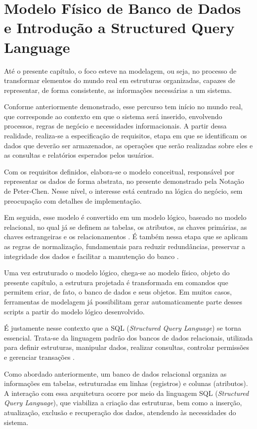 \chapter{Modelo Físico de Banco de Dados e Introdução a Structured Query Language}
\label{cap:modelo_fisico}

Até o presente capítulo, o foco esteve na modelagem, ou seja, no processo de transformar elementos do mundo real em estruturas organizadas, capazes de representar, de forma consistente, as informações necessárias a um sistema.

Conforme anteriormente demonstrado, esse percurso tem início no mundo real, que corresponde ao contexto em que o sistema será inserido, envolvendo processos, regras de negócio e necessidades informacionais. A partir dessa realidade, realiza-se a especificação de requisitos, etapa em que se identificam os dados que deverão ser armazenados, as operações que serão realizadas sobre eles e as consultas e relatórios esperados pelos usuários.

Com os requisitos definidos, elabora-se o modelo conceitual, responsável por representar os dados de forma abstrata, no presente demonstrado pela Notação de Peter-Chen. Nesse nível, o interesse está centrado na lógica do negócio, sem preocupação com detalhes de implementação. 

Em seguida, esse modelo é convertido em um modelo lógico, baseado no modelo relacional, no qual já se definem as tabelas, os atributos, as chaves primárias, as chaves estrangeiras e os relacionamentos \cite{codd1970relational}. É também nessa etapa que se aplicam as regras de normalização, fundamentais para reduzir redundâncias, preservar a integridade dos dados e facilitar a manutenção do banco \cite{angelotti2010banco}.

Uma vez estruturado o modelo lógico, chega-se ao modelo físico, objeto do presente capítulo, a estrutura projetada é transformada em comandos que permitem criar, de fato, o banco de dados e seus objetos. Em muitos casos, ferramentas de modelagem já possibilitam gerar automaticamente parte desses scripts a partir do modelo lógico desenvolvido.

É justamente nesse contexto que a SQL (\textit{Structured Query Language}) se torna essencial. Trata-se da linguagem padrão dos bancos de dados relacionais, utilizada para definir estruturas, manipular dados, realizar consultas, controlar permissões e gerenciar transações \cite{date2003introducao}. 

Como abordado anteriormente, um banco de dados relacional organiza as informações em tabelas, estruturadas em linhas (registros) e colunas (atributos). A interação com essa arquitetura ocorre por meio da linguagem SQL (\textit{Structured Query Language}), que viabiliza a criação das estruturas, bem como a inserção, atualização, exclusão e recuperação dos dados, atendendo às necessidades do sistema.

